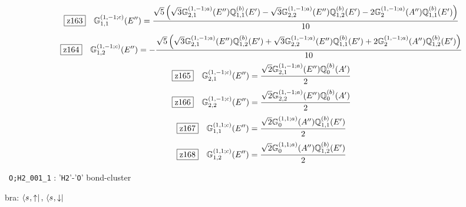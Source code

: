 \documentclass[fleqn,10pt,landscape]{jsarticle}
\begin{document}
\begin{dmath*}
\hspace*{3mm}\fbox{z163}\quad \mathbb{G}_{1,1}^{(1,-1;c)}(E^{\prime\prime})=\frac{\sqrt{5} \left(\sqrt{3} \mathbb{G}_{2,1}^{(1,-1;a)}(E^{\prime\prime}) \mathbb{Q}_{1,1}^{(b)}(E^{\prime}) - \sqrt{3} \mathbb{G}_{2,2}^{(1,-1;a)}(E^{\prime\prime}) \mathbb{Q}_{1,2}^{(b)}(E^{\prime}) - 2 \mathbb{G}_{2}^{(1,-1;a)}(A^{\prime\prime}) \mathbb{Q}_{1,1}^{(b)}(E^{\prime})\right)}{10}
\end{dmath*}
\begin{dmath*}
\hspace*{3mm}\fbox{z164}\quad \mathbb{G}_{1,2}^{(1,-1;c)}(E^{\prime\prime})=- \frac{\sqrt{5} \left(\sqrt{3} \mathbb{G}_{2,1}^{(1,-1;a)}(E^{\prime\prime}) \mathbb{Q}_{1,2}^{(b)}(E^{\prime}) + \sqrt{3} \mathbb{G}_{2,2}^{(1,-1;a)}(E^{\prime\prime}) \mathbb{Q}_{1,1}^{(b)}(E^{\prime}) + 2 \mathbb{G}_{2}^{(1,-1;a)}(A^{\prime\prime}) \mathbb{Q}_{1,2}^{(b)}(E^{\prime})\right)}{10}
\end{dmath*}
\begin{dmath*}
\hspace*{3mm}\fbox{z165}\quad \mathbb{G}_{2,1}^{(1,-1;c)}(E^{\prime\prime})=\frac{\sqrt{2} \mathbb{G}_{2,1}^{(1,-1;a)}(E^{\prime\prime}) \mathbb{Q}_{0}^{(b)}(A^{\prime})}{2}
\end{dmath*}
\begin{dmath*}
\hspace*{3mm}\fbox{z166}\quad \mathbb{G}_{2,2}^{(1,-1;c)}(E^{\prime\prime})=\frac{\sqrt{2} \mathbb{G}_{2,2}^{(1,-1;a)}(E^{\prime\prime}) \mathbb{Q}_{0}^{(b)}(A^{\prime})}{2}
\end{dmath*}
\begin{dmath*}
\hspace*{3mm}\fbox{z167}\quad \mathbb{G}_{1,1}^{(1,1;c)}(E^{\prime\prime})=\frac{\sqrt{2} \mathbb{G}_{0}^{(1,1;a)}(A^{\prime\prime}) \mathbb{Q}_{1,1}^{(b)}(E^{\prime})}{2}
\end{dmath*}
\begin{dmath*}
\hspace*{3mm}\fbox{z168}\quad \mathbb{G}_{1,2}^{(1,1;c)}(E^{\prime\prime})=\frac{\sqrt{2} \mathbb{G}_{0}^{(1,1;a)}(A^{\prime\prime}) \mathbb{Q}_{1,2}^{(b)}(E^{\prime})}{2}
\end{dmath*}
\vspace{5mm}

\noindent\textbullet\, \texttt{O;H2_001_1} : '\texttt{H2}'-'\texttt{O}' bond-cluster

\noindent\quad * bra: $\bra{s_{},\uparrow},\, \bra{s_{},\downarrow}$
\end{document}
